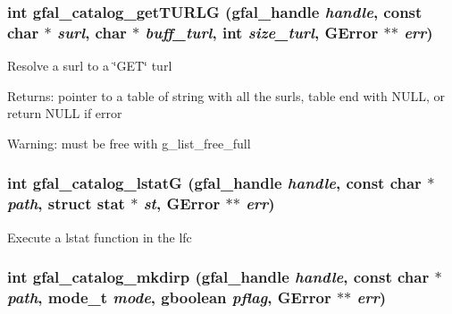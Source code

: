 \subsubsection{\setlength{\rightskip}{0pt plus 5cm}int gfal\_\-catalog\_\-get\-TURLG (gfal\_\-handle {\em handle}, const char $\ast$ {\em surl}, char $\ast$ {\em buff\_\-turl}, int {\em size\_\-turl}, GError $\ast$$\ast$ {\em err})}\label{gfal__common__catalog_8h_a9e232448a5906afb93e9f17dcce697c}


Resolve a surl to a \char`\"{}GET\char`\"{} turl \begin{Desc}
\item[Returns:]pointer to a table of string with all the surls, table end with NULL, or return NULL if error \end{Desc}
\begin{Desc}
\item[Warning:]must be free with g\_\-list\_\-free\_\-full \end{Desc}
\subsubsection{\setlength{\rightskip}{0pt plus 5cm}int gfal\_\-catalog\_\-lstat\-G (gfal\_\-handle {\em handle}, const char $\ast$ {\em path}, struct stat $\ast$ {\em st}, GError $\ast$$\ast$ {\em err})}\label{gfal__common__catalog_8h_1ad1b1f96272dbf43a15e7ea5d35389d}


Execute a lstat function in the lfc 
\subsubsection{\setlength{\rightskip}{0pt plus 5cm}int gfal\_\-catalog\_\-mkdirp (gfal\_\-handle {\em handle}, const char $\ast$ {\em path}, mode\_\-t {\em mode}, gboolean {\em pflag}, GError $\ast$$\ast$ {\em err})}\label{gfal__common__catalog_8h_93da9b37bece0b034d80c17131761110}


